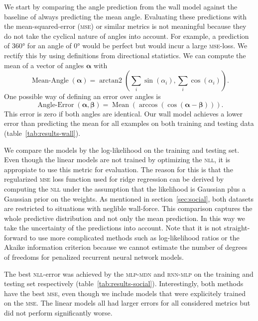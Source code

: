 \documentclass[nobib, a4paper]{tufte-handout}
\begin{document}
We start by comparing the angle prediction from the wall model against the baseline of always predicting the mean angle.
Evaluating these predictions with the mean-squared-error (\textsc{mse}) or similar metrics is not meaningful because they do not take the cyclical nature of angles into account.
For example, a prediction of \ang{360} for an angle of \ang{0} would be perfect but would incur a large \textsc{mse}-loss.
We rectify this by using definitions from directional statistics\autocite{circularStatistics}.
We can compute the mean of a vector of angles \(\bm{\alpha}\) with
\begin{equation*}
 \operatorname{Mean-Angle}(\bm{\alpha}) = \operatorname{arctan2} \left( \sum_i \sin \left( \alpha_i \right),  \sum_i \cos \left( \alpha_i \right)  \right).
\end{equation*}
One possible way of defining an error over angles is
\begin{equation}\label{eq:angle-error}
 \operatorname{Angle-Error}(\bm{\alpha}, \bm{\beta}) = \operatorname{Mean} \left( \operatorname{arccos} \left(  \cos  (\bm{\alpha} - \bm{\beta})  \right) \right).
\end{equation}
This error is zero if both angles are identical.
Our wall model achieves a lower error than predicting the mean for all examples on both training and testing data (table~\ref{tab:results-wall}).

We compare the models by the log-likelihood on the training and testing set.
Even though the linear models are not trained by optimizing the \textsc{nll}, it is appropiate to use this metric for evaluation.
The reason for this is that the regularized \textsc{mse} loss function used for ridge regression can be derived by computing the \textsc{nll} under the assumption that the likelihood is Gaussian plus a Gaussian prior on the weights.
As mentioned in section~\ref{sec:social}, both datasets are restricted to situations with neglible wall-force.
This comparison captures the whole predictive distribution and not only the mean prediction.
In this way we take the uncertainty of the predictions into account.
Note that it is not straight-forward to use more complicated methods such as log-likelihood ratios or the Akaike information criterion because we cannot estimate the number of degrees of freedoms for penalized recurrent neural network models.

The best \textsc{nll}-error was achieved by the \textsc{mlp-mdn} and \textsc{rnn-mlp} on the training and testing set respectively (table~\ref{tab:results-social}).
Interestingly, both methods have the best \textsc{mse}, even though we include models that were explicitely trained on the \textsc{mse}.
The linear models all had larger errors for all considered metrics but did not perform significantly worse.
\end{document}
